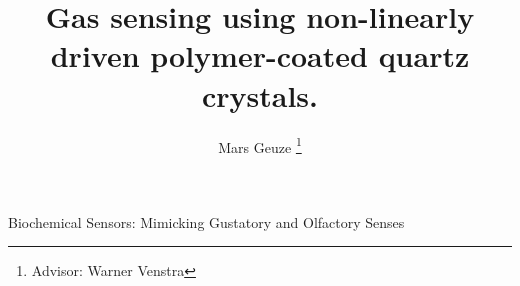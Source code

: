 \documentclass[12pt]{article}
\begin{document}
	\title{Gas sensing using non-linearly driven polymer-coated quartz crystals.}
	\author{Mars Geuze
	\thanks{Advisor: Warner Venstra}}
	\maketitle



\clearpage\tableofcontents






Biochemical Sensors: Mimicking Gustatory and Olfactory Senses
\clearpage

\end{document}
